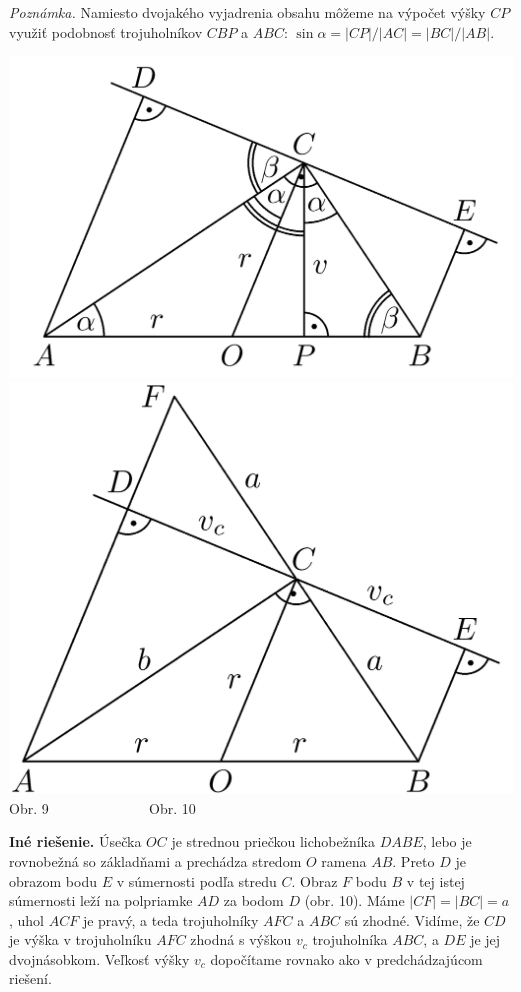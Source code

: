 \documentclass[11pt,a4paper,oneside,final]{book}
\begin{document}
\textit{Poznámka.} Namiesto dvojakého vyjadrenia obsahu môžeme na výpočet výšky $CP$ využiť podobnosť trojuholníkov $CBP$ a $ABC$: $\sin \alpha = |CP|/|AC| = |BC|/|AB|$.
\begin{center}
\includegraphics[scale=0.3]{58D21} \includegraphics[scale=0.3]{58D22}\\

Obr. 9 \ \ \  \ \ \ \ \ \ \hspace{80pt} \ \ \ \ Obr. 10
\end{center}
\textbf{Iné riešenie.} Úsečka $OC$ je strednou priečkou lichobežníka $DABE$, lebo je rovnobežná so základňami a prechádza stredom $O$ ramena $AB$. Preto $D$ je obrazom bodu $E$ v súmernosti podľa stredu $C$. Obraz $F$ bodu $B$ v tej istej súmernosti leží na polpriamke $AD$ za bodom $D$ (obr. 10). Máme $|CF| = |BC| = a$, uhol $ACF$ je pravý, a teda trojuholníky $AFC$ a $ABC$ sú zhodné. Vidíme, že $CD$ je výška v trojuholníku $AFC$ zhodná s výškou $v_c$ trojuholníka $ABC$, a $DE$ je jej dvojnásobkom. Veľkosť výšky $v_c$ dopočítame rovnako ako v predchádzajúcom riešení.
\end{document}
